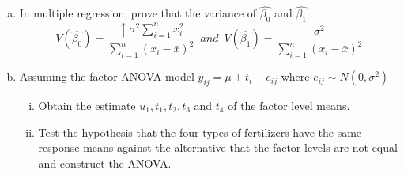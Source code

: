 \begin{enumerate}[(a)]
	\item In multiple regression, prove that the variance of $\hat{\beta_{0}}$ and $\hat{\beta_{1}}$
	$$V(\hat{\beta_{0}}) = \frac{\uparrow \sigma^{2}\displaystyle{\sum_{i=1}^{n}}x_{i}^{2}}{\displaystyle{\sum_{i=1}^{n}}(x_{i}-\bar{x})^{2}} \enspace and \enspace V(\hat{\beta_{1}}) = \frac{\sigma^{2}}{\displaystyle{\sum_{i=1}^{n}}(x_{i}-\bar{x})^{2}}$$ 
	\item Assuming the factor ANOVA model $y_{ij} = \mu + t_{i} + e_{ij}$ where $e_{ij} \sim N(0,\sigma^{2})$
	\begin{enumerate}[(i)]
		\item Obtain the estimate $u_{1},t_{1}, t_{2}, t_{3}$ and $t_{4}$ of the factor level means. 
		\item Test the hypothesis that the four types of fertilizers have the same response means
		against the alternative that the factor levels are not equal and construct the
		ANOVA.
	\end{enumerate}
\end{enumerate}